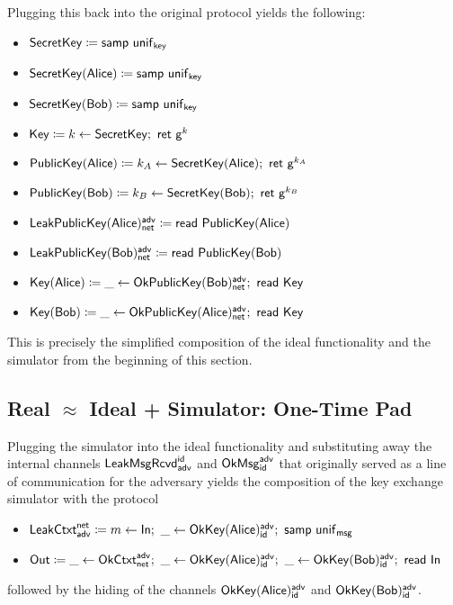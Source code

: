 \noindent Plugging this back into the original protocol yields the following:

\begin{itemize}
\item $\mathsf{SecretKey} \coloneqq \mathsf{samp} \ \mathsf{unif}_{\mathsf{key}}$
\item $\mathsf{SecretKey}(\mathsf{Alice}) \coloneqq \mathsf{samp} \ \mathsf{unif}_{\mathsf{key}}$
\item $\mathsf{SecretKey}(\mathsf{Bob}) \coloneqq \mathsf{samp} \ \mathsf{unif}_{\mathsf{key}}$
\item $\mathsf{Key} \coloneqq k \leftarrow \mathsf{SecretKey}; \ \mathsf{ret} \ \mathsf{g}^k$
\item $\mathsf{PublicKey}(\mathsf{Alice}) \coloneqq k_A \leftarrow \mathsf{SecretKey}(\mathsf{Alice}); \ \mathsf{ret} \ \mathsf{g}^{k_A}$
\item $\mathsf{PublicKey}(\mathsf{Bob}) \coloneqq k_B \leftarrow \mathsf{SecretKey}(\mathsf{Bob}); \ \mathsf{ret} \ \mathsf{g}^{k_B}$
\item $\mathsf{LeakPublicKey}(\mathsf{Alice})^{\mathsf{adv}}_{\mathsf{net}} \coloneqq \mathsf{read} \ \mathsf{PublicKey}(\mathsf{Alice})$
\item $\mathsf{LeakPublicKey}(\mathsf{Bob})^{\mathsf{adv}}_{\mathsf{net}} \coloneqq \mathsf{read} \ \mathsf{PublicKey}(\mathsf{Bob})$
\item $\mathsf{Key}(\mathsf{Alice}) \coloneqq \_ \leftarrow \mathsf{OkPublicKey}(\mathsf{Bob})^{\mathsf{adv}}_{\mathsf{net}}; \ \mathsf{read} \ \mathsf{Key}$
\item $\mathsf{Key}(\mathsf{Bob}) \coloneqq \_ \leftarrow \mathsf{OkPublicKey}(\mathsf{Alice})^{\mathsf{adv}}_{\mathsf{net}}; \ \mathsf{read} \ \mathsf{Key}$
\end{itemize}

\noindent This is precisely the simplified composition of the ideal functionality and the simulator from the beginning of this section.

\subsection{Real \texorpdfstring{$\approx$}{Approximates} Ideal + Simulator: One-Time Pad}
Plugging the simulator into the ideal functionality and substituting away the internal channels $\mathsf{LeakMsgRcvd}^{\mathsf{id}}_{\mathsf{adv}}$ and $\mathsf{OkMsg}^{\mathsf{adv}}_{\mathsf{id}}$ that originally served as a line of communication for the adversary yields the composition of the key exchange simulator with the protocol
\begin{itemize}
\item $\LeakCtxt^\net_\adv \coloneqq m \leftarrow \In; \ \_ \leftarrow \OkKey(\Alice)^\adv_\id; \ \samp{\unif_\msg}$
\item $\mathsf{Out} \coloneqq \_ \leftarrow \mathsf{OkCtxt}^{\mathsf{adv}}_{\mathsf{net}}; \ \_ \leftarrow \mathsf{OkKey}(\mathsf{Alice})^{\mathsf{adv}}_{\mathsf{id}}; \ \_ \leftarrow \mathsf{OkKey}(\mathsf{Bob})^{\mathsf{adv}}_{\mathsf{id}}; \  \mathsf{read} \ \mathsf{In}$
\end{itemize}
followed by the hiding of the channels $\mathsf{OkKey}(\mathsf{Alice})^{\mathsf{adv}}_{\mathsf{id}}$ and $\mathsf{OkKey}(\mathsf{Bob})^{\mathsf{adv}}_{\mathsf{id}}$.

